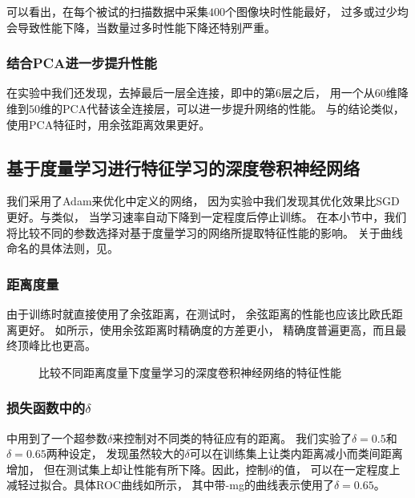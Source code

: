 可以看出，在每个被试的扫描数据中采集$400$个图像块时性能最好，
过多或过少均会导致性能下降，当数量过多时性能下降还特别严重。

\subsubsection{结合PCA进一步提升性能}
在实验中我们还发现，去掉最后一层全连接，即中的第6层之后，
用一个从$60$维降维到$50$维的PCA代替该全连接层，可以进一步提升网络的性能。
与的结论类似，使用PCA特征时，用余弦距离效果更好。


\subsection{基于度量学习进行特征学习的深度卷积神经网络}
我们采用了Adam\cite{kingma2014adam}来优化中定义的网络，
因为实验中我们发现其优化效果比SGD更好。与类似，
当学习速率自动下降到一定程度后停止训练。
在本小节中，我们将比较不同的参数选择对基于度量学习的网络所提取特征性能的影响。
关于曲线命名的具体法则，见。

\subsubsection{距离度量}
由于训练时就直接使用了余弦距离，在测试时，
余弦距离的性能也应该比欧氏距离更好。
如所示，使用余弦距离时精确度的方差更小，
精确度普遍更高，而且最终顶峰比也更高。

\begin{figure}[H]
    \caption{比较不同距离度量下度量学习的深度卷积神经网络的特征性能}
    \label{fig:expr:curve:mtrc:measure}
\end{figure}

\subsubsection{损失函数中的$\delta$}
中用到了一个超参数$\delta$来控制对不同类的特征应有的距离。
我们实验了$\delta=0.5$和$\delta=0.65$两种设定，
发现虽然较大的$\delta$可以在训练集上让类内距离减小而类间距离增加，
但在测试集上却让性能有所下降。因此，控制$\delta$的值，
可以在一定程度上减轻过拟合。具体ROC曲线如所示，
其中带-mg的曲线表示使用了$\delta=0.65$。

